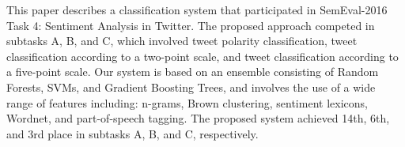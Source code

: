 This paper describes a classification system that participated in SemEval-2016 Task 4: Sentiment Analysis in Twitter. The proposed approach competed in subtasks A, B, and C, which involved tweet polarity classification, tweet classification according to a two-point scale, and tweet classification according to a five-point scale. Our system is based on an ensemble consisting of Random Forests, SVMs, and Gradient Boosting Trees, and involves the use of a wide range of features including: n-grams, Brown clustering, sentiment lexicons, Wordnet, and part-of-speech tagging. The proposed system achieved 14th, 6th, and 3rd place in subtasks A, B, and C, respectively.
